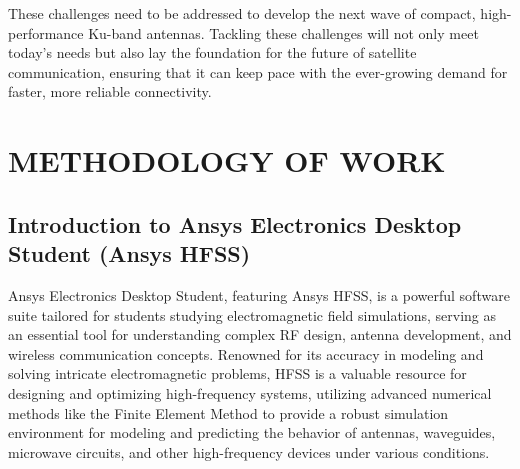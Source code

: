 \documentclass[12pt]{article}
\begin{document}
\par These challenges need to be addressed to develop the next wave of compact, high-performance Ku-band antennas. Tackling these challenges will not only meet today's needs but also lay the foundation for the future of satellite communication, ensuring that it can keep pace with the ever-growing demand for faster, more reliable connectivity.\\




\newpage
\section{METHODOLOGY OF WORK}

\subsection{Introduction to Ansys Electronics Desktop Student (Ansys HFSS)}
\par Ansys Electronics Desktop Student, featuring Ansys HFSS, is a powerful software suite tailored for students studying electromagnetic field simulations, serving as an essential tool for understanding complex RF design, antenna development, and wireless communication concepts. Renowned for its accuracy in modeling and solving intricate electromagnetic problems, HFSS is a valuable resource for designing and optimizing high-frequency systems, utilizing advanced numerical methods like the Finite Element Method to provide a robust simulation environment for modeling and predicting the behavior of antennas, waveguides, microwave circuits, and other high-frequency devices under various conditions.\\
\end{document}
